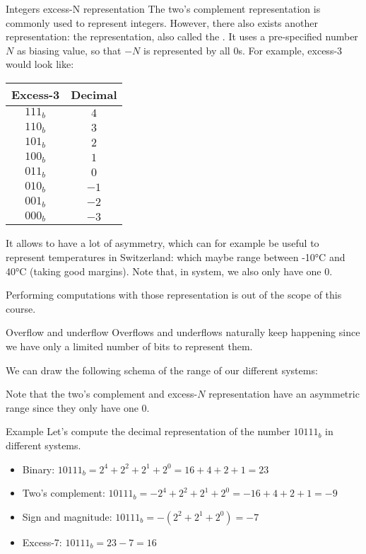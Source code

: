 \documentclass[a4paper]{article}
\begin{document}
\begin{parag}{Integers excess-N representation}
    The two's complement representation is commonly used to represent integers. However, there also exists another representation: the  representation, also called the . It uses a pre-specified number $N$ as biasing value, so that $-N$ is represented by all 0s. For example, excess-3 would look like:
    \begin{center}
    \begin{tabular}{c|c}
        Excess-3 & Decimal \\
        \hline
        $111_b$ & $4$ \\
        $110_b$ & $3$ \\
        $101_b$ & $2$ \\
        $100_b$ & $1$ \\
        $011_b$ & $0$ \\
        $010_b$ & $-1$ \\
        $001_b$ & $-2$ \\
        $000_b$ & $-3$ \\
    \end{tabular}
    \end{center}

    It allows to have a lot of asymmetry, which can for example be useful to represent temperatures in Switzerland: which maybe range between -10°C and 40°C (taking good margins). Note that, in system, we also only have one 0.

    Performing computations with those representation is out of the scope of this course.
\end{parag}

\begin{parag}{Overflow and underflow}
    Overflows and underflows naturally keep happening since we have only a limited number of bits to represent them.

    We can draw the following schema of the range of our different systems:


    Note that the two's complement and excess-$N$ representation have an asymmetric range since they only have one $0$.
\end{parag}

\begin{parag}{Example}
    Let's compute the decimal representation of the number $10111_b$ in different systems.

    \begin{itemize}[left=0pt]
        \item Binary: $10111_b = 2^4 + 2^2 + 2^1 + 2^0 = 16 + 4 + 2 + 1 = 23$
        \item Two's complement: $10111_b = -2^4 + 2^2 + 2^1 + 2^0 = -16 + 4 + 2 + 1 = -9$
        \item Sign and magnitude: $10111_b = -\left(2^2 + 2^1 + 2^0\right) = -7$
        \item Excess-7: $10111_b = 23 - 7 = 16$
    \end{itemize}
    
    
\end{parag}
\end{document}
